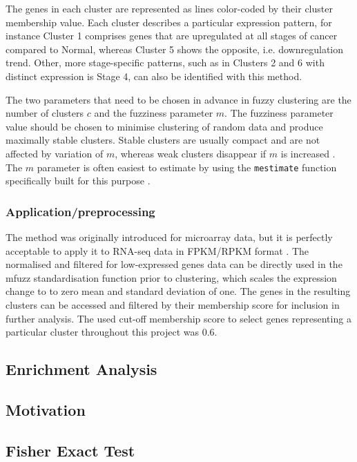  The genes in each cluster are represented as lines color-coded by their cluster membership value.  Each cluster describes a particular expression pattern, for instance Cluster 1 comprises genes that are upregulated at all stages of cancer compared to Normal, whereas Cluster 5 shows the opposite, i.e. downregulation trend. Other, more stage-specific patterns, such as in Clusters 2 and 6 with distinct expression is Stage 4, can also be identified with this method. 
 
  
The two parameters that need to be chosen in advance in fuzzy clustering are the number of clusters $c$ and the fuzziness parameter $m$. The fuzziness parameter value should be chosen to minimise clustering of random data and produce maximally stable clusters. Stable clusters are usually compact and are not affected by variation of $m$, whereas weak clusters disappear if $m$ is increased \cite{Kumar2007Mfuzz:Data}. The $m$ parameter is often easiest to estimate by using the \texttt{mestimate} function specifically built for this purpose \cite{Schwammle2010AAnalysis}. 
 
  
 
 
\subsubsection{Application/preprocessing}
 
The method was originally introduced for microarray data, but it is perfectly acceptable to apply it to RNA-seq data in FPKM/RPKM format \cite{Futschik2007MfuzzHomepage}.  The normalised and filtered for low-expressed genes data can be directly used in the mfuzz standardisation function prior to clustering, which scales the expression change to to zero mean and standard deviation of one.
The genes in the resulting clusters can be accessed and filtered by their membership score for inclusion in further analysis. The used cut-off membership score to select genes representing a particular cluster throughout this project was 0.6. 





    
    \subsection{Enrichment Analysis}
    
    \subsection{Motivation}
    
    \subsection{Fisher Exact Test}
    
    
    
